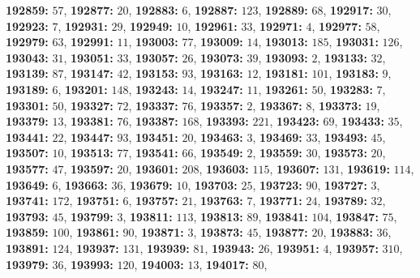 \textsf{\bfseries 192859:} $57$, \textsf{\bfseries 192877:} $20$, \textsf{\bfseries 192883:} $6$, \textsf{\bfseries 192887:} $123$, \textsf{\bfseries 192889:} $68$, \textsf{\bfseries 192917:} $30$, \textsf{\bfseries 192923:} $7$, \textsf{\bfseries 192931:} $29$, \textsf{\bfseries 192949:} $10$, \textsf{\bfseries 192961:} $33$, \textsf{\bfseries 192971:} $4$, \textsf{\bfseries 192977:} $58$, \textsf{\bfseries 192979:} $63$, \textsf{\bfseries 192991:} $11$, \textsf{\bfseries 193003:} $77$, \textsf{\bfseries 193009:} $14$, \textsf{\bfseries 193013:} $185$, \textsf{\bfseries 193031:} $126$, \textsf{\bfseries 193043:} $31$, \textsf{\bfseries 193051:} $33$, \textsf{\bfseries 193057:} $26$, \textsf{\bfseries 193073:} $39$, \textsf{\bfseries 193093:} $2$, \textsf{\bfseries 193133:} $32$, \textsf{\bfseries 193139:} $87$, \textsf{\bfseries 193147:} $42$, \textsf{\bfseries 193153:} $93$, \textsf{\bfseries 193163:} $12$, \textsf{\bfseries 193181:} $101$, \textsf{\bfseries 193183:} $9$, \textsf{\bfseries 193189:} $6$, \textsf{\bfseries 193201:} $148$, \textsf{\bfseries 193243:} $14$, \textsf{\bfseries 193247:} $11$, \textsf{\bfseries 193261:} $50$, \textsf{\bfseries 193283:} $7$, \textsf{\bfseries 193301:} $50$, \textsf{\bfseries 193327:} $72$, \textsf{\bfseries 193337:} $76$, \textsf{\bfseries 193357:} $2$, \textsf{\bfseries 193367:} $8$, \textsf{\bfseries 193373:} $19$, \textsf{\bfseries 193379:} $13$, \textsf{\bfseries 193381:} $76$, \textsf{\bfseries 193387:} $168$, \textsf{\bfseries 193393:} $221$, \textsf{\bfseries 193423:} $69$, \textsf{\bfseries 193433:} $35$, \textsf{\bfseries 193441:} $22$, \textsf{\bfseries 193447:} $93$, \textsf{\bfseries 193451:} $20$, \textsf{\bfseries 193463:} $3$, \textsf{\bfseries 193469:} $33$, \textsf{\bfseries 193493:} $45$, \textsf{\bfseries 193507:} $10$, \textsf{\bfseries 193513:} $77$, \textsf{\bfseries 193541:} $66$, \textsf{\bfseries 193549:} $2$, \textsf{\bfseries 193559:} $30$, \textsf{\bfseries 193573:} $20$, \textsf{\bfseries 193577:} $47$, \textsf{\bfseries 193597:} $20$, \textsf{\bfseries 193601:} $208$, \textsf{\bfseries 193603:} $115$, \textsf{\bfseries 193607:} $131$, \textsf{\bfseries 193619:} $114$, \textsf{\bfseries 193649:} $6$, \textsf{\bfseries 193663:} $36$, \textsf{\bfseries 193679:} $10$, \textsf{\bfseries 193703:} $25$, \textsf{\bfseries 193723:} $90$, \textsf{\bfseries 193727:} $3$, \textsf{\bfseries 193741:} $172$, \textsf{\bfseries 193751:} $6$, \textsf{\bfseries 193757:} $21$, \textsf{\bfseries 193763:} $7$, \textsf{\bfseries 193771:} $24$, \textsf{\bfseries 193789:} $32$, \textsf{\bfseries 193793:} $45$, \textsf{\bfseries 193799:} $3$, \textsf{\bfseries 193811:} $113$, \textsf{\bfseries 193813:} $89$, \textsf{\bfseries 193841:} $104$, \textsf{\bfseries 193847:} $75$, \textsf{\bfseries 193859:} $100$, \textsf{\bfseries 193861:} $90$, \textsf{\bfseries 193871:} $3$, \textsf{\bfseries 193873:} $45$, \textsf{\bfseries 193877:} $20$, \textsf{\bfseries 193883:} $36$, \textsf{\bfseries 193891:} $124$, \textsf{\bfseries 193937:} $131$, \textsf{\bfseries 193939:} $81$, \textsf{\bfseries 193943:} $26$, \textsf{\bfseries 193951:} $4$, \textsf{\bfseries 193957:} $310$, \textsf{\bfseries 193979:} $36$, \textsf{\bfseries 193993:} $120$, \textsf{\bfseries 194003:} $13$, \textsf{\bfseries 194017:} $80$, 
